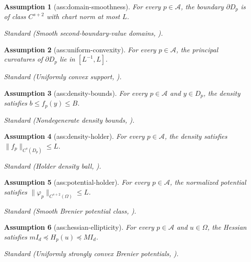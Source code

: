 \documentclass{article}
\newtheorem{assumption}{Assumption}
\begin{document}
\begin{assumption}[ass:domain-smoothness]\label{ass:domain-smoothness}
For every \(p\in\mathcal A\), the boundary \(\partial D_p\) is of class \(C^{s+2}\) with chart norm at most \(L\).
\par\smallskip\noindent\emph{Standard} (Smooth second-boundary-value domains, \cite{CajaLopezDelgadinoKitagawa2026Stability}).
\end{assumption}

\begin{assumption}[ass:uniform-convexity]\label{ass:uniform-convexity}
For every \(p\in\mathcal A\), the principal curvatures of \(\partial D_p\) lie in \([L^{-1},L]\).
\par\smallskip\noindent\emph{Standard} (Uniformly convex support, \cite{HutterRigollet2021MinimaxOT}).
\end{assumption}

\begin{assumption}[ass:density-bounds]\label{ass:density-bounds}
For every \(p\in\mathcal A\) and \(y\in D_p\), the density satisfies \(b\le f_p(y)\le B\).
\par\smallskip\noindent\emph{Standard} (Nondegenerate density bounds, \cite{CajaLopezDelgadinoKitagawa2026Stability}).
\end{assumption}

\begin{assumption}[ass:density-holder]\label{ass:density-holder}
For every \(p\in\mathcal A\), the density satisfies \(\lVert f_p\rVert_{C^s(D_p)}\le L\).
\par\smallskip\noindent\emph{Standard} (Holder density ball, \cite{ManoleBalakrishnanNilesWeedWasserman2024Plugin}).
\end{assumption}

\begin{assumption}[ass:potential-holder]\label{ass:potential-holder}
For every \(p\in\mathcal A\), the normalized potential satisfies \(\lVert\varphi_p\rVert_{C^{s+2}(\Omega)}\le L\).
\par\smallskip\noindent\emph{Standard} (Smooth Brenier potential class, \cite{HutterRigollet2021MinimaxOT}).
\end{assumption}

\begin{assumption}[ass:hessian-ellipticity]\label{ass:hessian-ellipticity}
For every \(p\in\mathcal A\) and \(u\in\Omega\), the Hessian satisfies \(mI_d\preceq H_p(u)\preceq MI_d\).
\par\smallskip\noindent\emph{Standard} (Uniformly strongly convex Brenier potentials, \cite{HutterRigollet2021MinimaxOT}).
\end{assumption}
\end{document}
